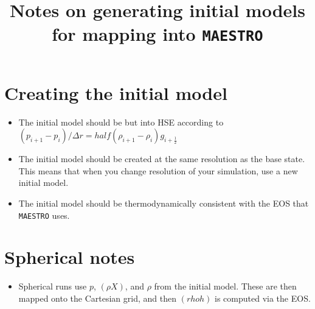 \documentclass[11pt]{article}
\title{Notes on generating initial models for mapping into {\tt MAESTRO}}
\def\half  {\frac{1}{2}}
\begin{document}
\maketitle
\tableofcontents

\section{Creating the initial model}
\begin{itemize}
\item The initial model should be but into HSE according to $(p_{i+1} - p_i)/\Delta r = half (\rho_{i+1} - \rho_i) g_{i+\half}$

\item The initial model should be created at the same resolution as the base state.  This means that
when you change resolution of your simulation, use a new initial model.

\item The initial model should be thermodynamically consistent with the EOS that {\tt MAESTRO}
uses.

\end{itemize}

\section{Spherical notes}
\begin{itemize}
\item Spherical runs use $p$, $(\rho X)$, and $\rho$ from the initial model.  These are then
mapped onto the Cartesian grid, and then $(rho h)$ is computed via the EOS.
\end{itemize}
\end{document}
